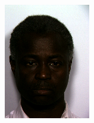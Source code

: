\begin{figure}[h]
\begin{subfigure}[b]{0.18\textwidth}
         \includegraphics[width=\textwidth]{images/results/base_st/dd110.color.d3_x.png}
     \end{subfigure}
     \hfill
     \begin{subfigure}[b]{0.18\textwidth}
         \centering

\end{subfigure}
\end{figure}
